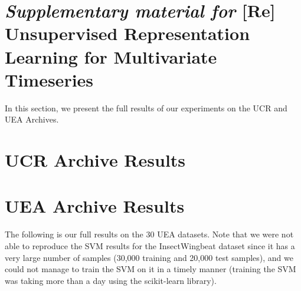 

\section*{\textit{Supplementary material for} [Re] Unsupervised Representation Learning for Multivariate Timeseries}

%
In this section, we present the full results of our experiments on the UCR and UEA Archives.

\section{UCR Archive Results}
\drawucrsteps
 

\section{UEA Archive Results}
The following is our full results on the 30 UEA datasets. Note that we were not able to reproduce the SVM results for the InsectWingbeat dataset since it has a very large number of samples (30,000 training and 20,000 test samples), and we could not manage to train the SVM on it in a timely manner (training the SVM was taking more than a day using the scikit-learn library).

\drawueasteps

%

 



